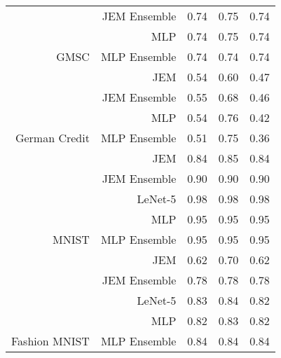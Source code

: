 \begin{table}
\begin{tabular}[t]{rrrrr}
 & JEM Ensemble & 0.74 & 0.75 & 0.74\\

 & MLP & 0.74 & 0.75 & 0.74\\

\multirow[t]{-4}{*}{\raggedleft\arraybackslash GMSC} & MLP Ensemble & 0.74 & 0.74 & 0.74\\
\cmidrule{1-5}
 & JEM & 0.54 & 0.60 & 0.47\\

 & JEM Ensemble & 0.55 & 0.68 & 0.46\\

 & MLP & 0.54 & 0.76 & 0.42\\

\multirow[t]{-4}{*}{\raggedleft\arraybackslash German Credit} & MLP Ensemble & 0.51 & 0.75 & 0.36\\
\cmidrule{1-5}
 & JEM & 0.84 & 0.85 & 0.84\\

 & JEM Ensemble & 0.90 & 0.90 & 0.90\\

 & LeNet-5 & 0.98 & 0.98 & 0.98\\

 & MLP & 0.95 & 0.95 & 0.95\\

\multirow[t]{-5}{*}{\raggedleft\arraybackslash MNIST} & MLP Ensemble & 0.95 & 0.95 & 0.95\\
\cmidrule{1-5}
 & JEM & 0.62 & 0.70 & 0.62\\

 & JEM Ensemble & 0.78 & 0.78 & 0.78\\

 & LeNet-5 & 0.83 & 0.84 & 0.82\\

 & MLP & 0.82 & 0.83 & 0.82\\

\multirow[t]{-5}{*}{\raggedleft\arraybackslash Fashion MNIST} & MLP Ensemble & 0.84 & 0.84 & 0.84\\
\bottomrule
\end{tabular}
\end{table}
